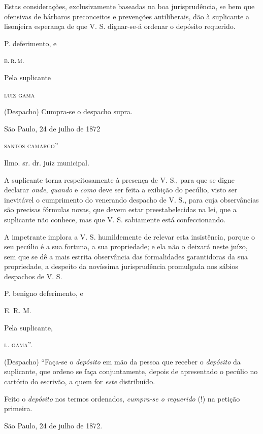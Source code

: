 Estas considerações, exclusivamente baseadas na boa jurisprudência, se
bem que ofensivas de bárbaros preconceitos e prevenções antiliberais,
dão à suplicante a lisonjeira esperança de que V. S. dignar-se-á ordenar
o depósito requerido.

\begin{flushright}
P. deferimento, e

\textsc{e.\,r.\,m.}

Pela suplicante

\textsc{luiz gama}
\end{flushright}

(Despacho) Cumpra-se o despacho supra.

\begin{flushright}
São Paulo, 24 de julho de 1872

\textsc{santos camargo}''
\end{flushright}

\asterisc

Ilmo. sr. dr. juiz municipal.

A suplicante torna respeitosamente à presença de V. S., para que se
digne declarar \emph{onde}, \emph{quando} e \emph{como} deve ser feita a
exibição do pecúlio, visto ser inevitável o cumprimento do venerando
despacho de V. S., para cuja observâncias são precisas fórmulas novas,
que devem estar preestabelecidas na lei, que a suplicante não conhece,
mas que V. S. sabiamente está confeccionando.

A impetrante implora a V. S. humildemente de relevar esta insistência,
porque o seu pecúlio é a sua fortuna, a sua propriedade; e ela não o
deixará neste juízo, sem que se dê a mais estrita observância das
formalidades garantidoras da sua propriedade, a despeito da novíssima
jurisprudência promulgada nos sábios despachos de V. S.

P. benigno deferimento, e

E. R. M.

Pela suplicante,

\textsc{l. gama}''.

(Despacho) ``Faça-se o \emph{depósito} em mão da pessoa que receber o
\emph{depósito} da suplicante, que ordeno se faça conjuntamente, depois
de apresentado o pecúlio no cartório do escrivão, a quem for \emph{este}
distribuído.

Feito o \emph{depósito} nos termos ordenados, \emph{cumpra-se o
requerido} (!) na petição primeira.

São Paulo, 24 de julho de 1872.

